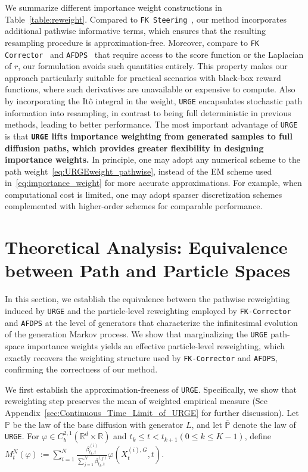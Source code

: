 \documentclass{article}
\theoremstyle{plain}
\theoremstyle{definition}
\theoremstyle{remark}
\renewcommand{\P}{{\mathbb{P}}}
\newcommand{\R}{{\mathbb{R}}}
\begin{document}
We summarize different importance weight constructions in Table~\ref{table:reweight}. Compared to \texttt{FK Steering}~\cite{singhal2025general}, our method incorporates additional pathwise informative terms, which ensures that the resulting resampling procedure is approximation-free. 
Moreover, compare to \texttt{FK Corrector}~\cite{skreta2025feynman} and \texttt{AFDPS}~\cite{chen2025solving} that require access to the score function or the Laplacian of \(r\), our formulation avoids such quantities entirely. This property makes our approach particularly suitable for practical scenarios with black-box reward functions, where such derivatives are unavailable or expensive to compute. 
Also by incorporating the It\^o integral in the weight, \texttt{URGE} encapsulates stochastic path information into resampling, in contrast to being full deterministic in previous methods, leading to better performance.
The most important advantage of \texttt{URGE} is that \textbf{\texttt{URGE} lifts importance weighting from generated samples to full diffusion paths, which provides greater flexibility in designing importance weights.} In principle, one may adopt any numerical scheme to the path weight~\eqref{eq:URGEweight_pathwise}, instead of the EM scheme used in~\eqref{eq:importance_weight} for more accurate approximations. For example, when computational cost is limited, one may adopt sparser discretization schemes complemented with higher-order schemes for comparable performance.

\section{Theoretical Analysis: Equivalence between Path and Particle Spaces}
\label{sec:Equivalent Margin between Girsanov SMC and AFDPS}

In this section, we establish the equivalence between the pathwise reweighting induced by \texttt{URGE} and the particle-level reweighting employed by \texttt{FK-Corrector} \cite{skreta2025feynman} and \texttt{AFDPS} \cite{chen2025solving} at the level of generators that characterize the infinitesimal evolution of the generation Markov process. We show that marginalizing the \texttt{URGE} path-space importance weights yields an effective particle-level reweighting, which exactly recovers the weighting structure used by \texttt{FK-Corrector} and \texttt{AFDPS}, confirming the correctness of our method.

We first establish the approximation-freeness of \texttt{URGE}. Specifically, we show that reweighting step preserves the mean of weighted empirical measure (See Appendix~\ref{sec:Continuous_Time_Limit_of_URGE} for further discussion). Let $\P$ be the law of the base diffusion with generator $L$, and let $\overline{\P}$ denote the law of \texttt{URGE}. For $\varphi\in C_b^{2,1}(\R^d\times \R)$ and \(t_k\leq t<t_{k+1}(0\leq k\leq K-1)\), define \(M_t^N(\varphi):= \sum_{i=1}^N \frac{\beta_{t_k,t}^{(i)}}{\sum_{j=1}^{N}\beta_{t_k,t}^{(j)}}\varphi(X_t^{(i),G},t)\).
\end{document}
